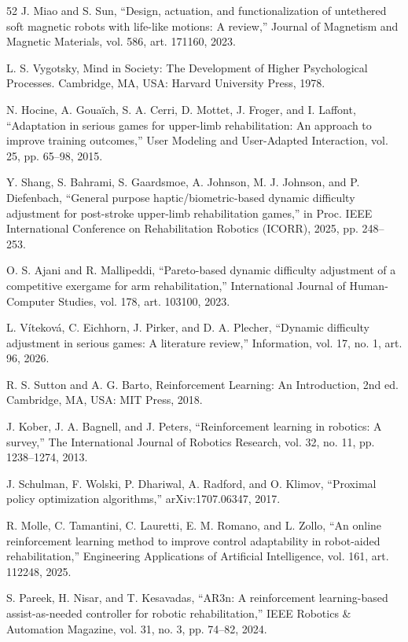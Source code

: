 \documentclass[journal,twoside,web]{ieeecolor2}
\begin{document}
\begin{thebibliography}{52}
 J. Miao and S. Sun, ``Design, actuation, and functionalization of untethered soft magnetic robots with life-like motions: A review,'' Journal of Magnetism and Magnetic Materials, vol. 586, art. 171160, 2023.

 L. S. Vygotsky, Mind in Society: The Development of Higher Psychological Processes. Cambridge, MA, USA: Harvard University Press, 1978.

 N. Hocine, A. Gouaïch, S. A. Cerri, D. Mottet, J. Froger, and I. Laffont, ``Adaptation in serious games for upper-limb rehabilitation: An approach to improve training outcomes,'' User Modeling and User-Adapted Interaction, vol. 25, pp. 65--98, 2015.

 Y. Shang, S. Bahrami, S. Gaardsmoe, A. Johnson, M. J. Johnson, and P. Diefenbach, ``General purpose haptic/biometric-based dynamic difficulty adjustment for post-stroke upper-limb rehabilitation games,'' in Proc. IEEE International Conference on Rehabilitation Robotics (ICORR), 2025, pp. 248--253.

 O. S. Ajani and R. Mallipeddi, ``Pareto-based dynamic difficulty adjustment of a competitive exergame for arm rehabilitation,'' International Journal of Human-Computer Studies, vol. 178, art. 103100, 2023.

 L. Víteková, C. Eichhorn, J. Pirker, and D. A. Plecher, ``Dynamic difficulty adjustment in serious games: A literature review,'' Information, vol. 17, no. 1, art. 96, 2026.

 R. S. Sutton and A. G. Barto, Reinforcement Learning: An Introduction, 2nd ed. Cambridge, MA, USA: MIT Press, 2018.

 J. Kober, J. A. Bagnell, and J. Peters, ``Reinforcement learning in robotics: A survey,'' The International Journal of Robotics Research, vol. 32, no. 11, pp. 1238--1274, 2013.

 J. Schulman, F. Wolski, P. Dhariwal, A. Radford, and O. Klimov, ``Proximal policy optimization algorithms,'' arXiv:1707.06347, 2017.

 R. Molle, C. Tamantini, C. Lauretti, E. M. Romano, and L. Zollo, ``An online reinforcement learning method to improve control adaptability in robot-aided rehabilitation,'' Engineering Applications of Artificial Intelligence, vol. 161, art. 112248, 2025.

 S. Pareek, H. Nisar, and T. Kesavadas, ``AR3n: A reinforcement learning-based assist-as-needed controller for robotic rehabilitation,'' IEEE Robotics \& Automation Magazine, vol. 31, no. 3, pp. 74--82, 2024.


\end{thebibliography}
\end{document}
